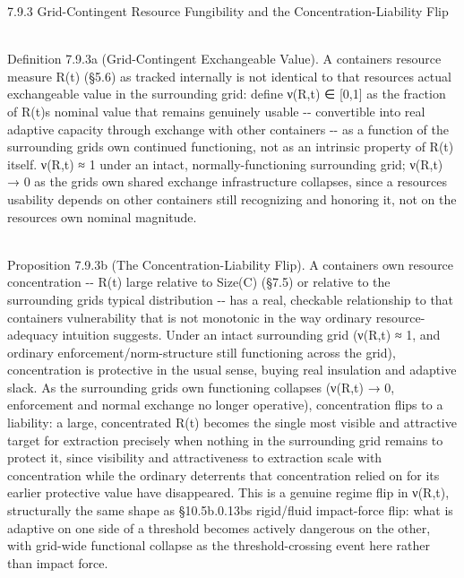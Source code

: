 \documentclass[
]{article}
\begin{document}
7.9.3 Grid-Contingent Resource Fungibility and the
Concentration-Liability Flip\\
\strut \\
Definition 7.9.3a (Grid-Contingent Exchangeable Value). A
container\textquotesingle s resource measure R(t) (§5.6) as tracked
internally is not identical to that resource\textquotesingle s actual
exchangeable value in the surrounding grid: define ν(R,t) ∈ {[}0,1{]} as
the fraction of R(t)\textquotesingle s nominal value that remains
genuinely usable -\/- convertible into real adaptive capacity through
exchange with other containers -\/- as a function of the surrounding
grid\textquotesingle s own continued functioning, not as an intrinsic
property of R(t) itself. ν(R,t) ≈ 1 under an intact,
normally-functioning surrounding grid; ν(R,t) → 0 as the
grid\textquotesingle s own shared exchange infrastructure collapses,
since a resource\textquotesingle s usability depends on other containers
still recognizing and honoring it, not on the resource\textquotesingle s
own nominal magnitude.\\
\strut \\
Proposition 7.9.3b (The Concentration-Liability Flip). A
container\textquotesingle s own resource concentration -\/- R(t) large
relative to Size(C) (§7.5) or relative to the surrounding
grid\textquotesingle s typical distribution -\/- has a real, checkable
relationship to that container\textquotesingle s vulnerability that is
not monotonic in the way ordinary resource-adequacy intuition suggests.
Under an intact surrounding grid (ν(R,t) ≈ 1, and ordinary
enforcement/norm-structure still functioning across the grid),
concentration is protective in the usual sense, buying real insulation
and adaptive slack. As the surrounding grid\textquotesingle s own
functioning collapses (ν(R,t) → 0, enforcement and normal exchange no
longer operative), concentration flips to a liability: a large,
concentrated R(t) becomes the single most visible and attractive target
for extraction precisely when nothing in the surrounding grid remains to
protect it, since visibility and attractiveness to extraction scale with
concentration while the ordinary deterrents that concentration relied on
for its earlier protective value have disappeared. This is a genuine
regime flip in ν(R,t), structurally the same shape as
§10.5b.0.13b\textquotesingle s rigid/fluid impact-force flip: what is
adaptive on one side of a threshold becomes actively dangerous on the
other, with grid-wide functional collapse as the threshold-crossing
event here rather than impact force.\\
\end{document}
